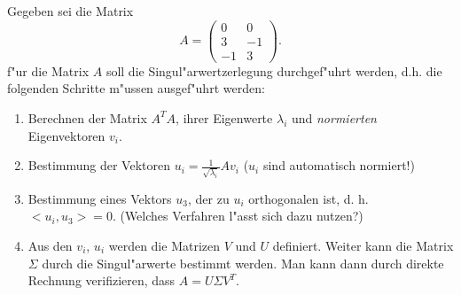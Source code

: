 \begin{bbspX}
Gegeben sei die Matrix 
$$A = \left(\begin{array}{cc} 0  & 0 \\3 & -1\\ -1 &3
\end{array}\right) .$$
f"ur die Matrix $A$ soll die Singul"arwertzerlegung durchgef"uhrt werden, d.h. die 
folgenden Schritte m"ussen ausgef"uhrt werden:
\begin{enumerate}
\item Berechnen der Matrix $A^TA$, ihrer Eigenwerte $\lambda_i$ und {\it normierten} 
Eigenvektoren
$v_i$.
\item Bestimmung der  Vektoren $u_i = \frac{1}{\sqrt{\lambda_i}}Av_i$ ($u_i$ sind 
automatisch normiert!)
\item Bestimmung eines Vektors $u_3$, der zu $u_i$ orthogonalen ist, d. h. 
$<u_i, u_3> = 0$. (Welches Verfahren l"asst sich dazu nutzen?)
\item Aus den  $v_i$, $u_i$ werden die Matrizen $V$ und $U$ definiert. Weiter 
kann die Matrix $\Sigma$ durch die Singul"arwerte bestimmt werden. Man kann dann 
durch direkte Rechnung verifizieren, dass $A = U \Sigma V^T$. 
\end{enumerate}


\end{bbspX}
